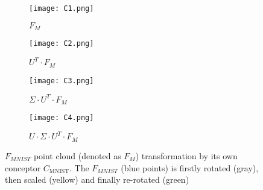 \documentclass[shortabstract, inz, english]{iithesis}
\DeclareMathOperator{\QCM}{MNIST}
\newcommand{\CM}{$C_{\QCM}$}
\begin{document}
\begin{figure}[!htpb]%
    \centering
    \begin{subfigure}[b]{0.24\textwidth}
        \texttt{[image: C1.png]}
        \caption{$F_{M}$}
    \end{subfigure}%
    \begin{subfigure}[b]{0.24\textwidth}
        \texttt{[image: C2.png]}
        \caption{$U^{T} \cdot F_{M}$}
    \end{subfigure}%
    \begin{subfigure}[b]{0.24\textwidth}
        \texttt{[image: C3.png]}
        \caption{$\Sigma \cdot U^{T} \cdot F_{M}$}
    \end{subfigure}%
    \begin{subfigure}[b]{0.24\textwidth}
        \texttt{[image: C4.png]}
        \caption{$U \cdot \Sigma \cdot U^{T} \cdot F_{M}$}
    \end{subfigure}%
    
    \caption{$F_{MNIST}$ point cloud (denoted as $F_{M}$) transformation by its own conceptor \CM. The  $F_{MNIST}$ (blue points) is firstly rotated (gray), then scaled (yellow) and finally re-rotated (green)}%
    \label{fig:ConceptorRotation}%
\end{figure}
\par
\end{document}
